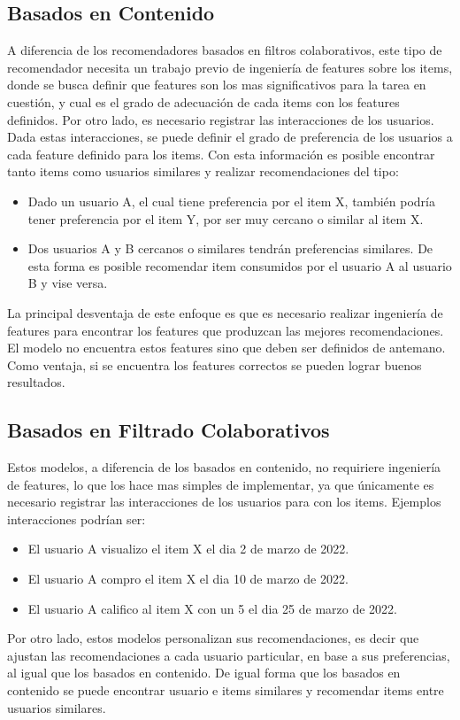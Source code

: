 \documentclass[11pt,a4paper,twoside]{thesis}
\begin{document}
\subsection{Basados en Contenido} 

A diferencia de los recomendadores basados en filtros colaborativos, este tipo de recomendador necesita un trabajo previo de ingeniería de features sobre los items, donde se busca definir que features son los mas significativos para la tarea en cuestión, y cual es el grado de adecuación de cada items con los features definidos. Por otro lado, es necesario registrar las interacciones de los usuarios. Dada estas interacciones, se puede definir el grado de preferencia de los usuarios a cada feature definido para los items. Con esta información es posible encontrar tanto items como usuarios similares y realizar recomendaciones del tipo:

\begin{itemize}
\item Dado un usuario A, el cual tiene preferencia por el item X, también podría tener preferencia por el item Y, por ser muy cercano o similar al item X.
\item Dos usuarios A y B cercanos o similares tendrán preferencias similares. De esta forma es posible recomendar item consumidos por el usuario A al usuario B y vise versa. 
\end{itemize}
	
La principal desventaja de este enfoque es que es necesario realizar ingeniería de features para encontrar los features que produzcan las mejores recomendaciones. El modelo no encuentra estos features sino que deben ser definidos de antemano. Como ventaja, si se encuentra los features correctos se pueden lograr buenos resultados.
		
\subsection{Basados en Filtrado Colaborativos} 

Estos modelos, a diferencia de los basados en contenido, no requiriere ingeniería de features, lo que los hace mas simples de implementar, ya que únicamente es necesario registrar las interacciones de los usuarios para con los items. Ejemplos interacciones podrían ser:
			\begin{itemize}
				\item El usuario A visualizo el item X el dia 2 de marzo de 2022.
				\item El usuario A compro el item X el dia 10 de marzo de 2022.
				\item El usuario A califico al item X con un 5 el dia 25 de marzo de 2022.
			\end{itemize}
			Por otro lado, estos modelos personalizan sus recomendaciones, es decir que ajustan las recomendaciones a cada usuario particular, en base a sus preferencias, al igual que los basados en contenido.
			De igual forma que los basados en contenido se puede encontrar usuario e items similares y recomendar items entre usuarios similares.
\end{document}
